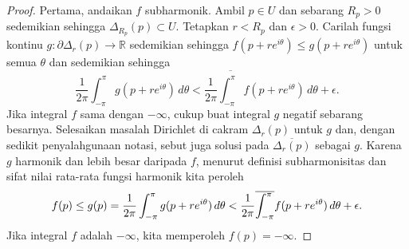 \documentclass[12pt,openany]{book}
\newcommand{\avoidbreak}{\postdisplaypenalty=100}
\newcommand{\R}{{\mathbb{R}}}
\theoremstyle{plain}
\theoremstyle{remark}
\theoremstyle{definition}
\theoremstyle{exercise}
\theoremstyle{example}
\begin{document}
\begin{proof}
Pertama, andaikan $f$ subharmonik.  Ambil $p \in U$ dan sebarang $R_p > 0$
sedemikian sehingga $\Delta_{R_p}(p) \subset U$.
Tetapkan $r < R_p$ dan $\epsilon > 0$.
Carilah fungsi kontinu $g \colon \partial \Delta_r(p) \to \R$
sedemikian sehingga $f(p+ re^{i\theta}) \leq g(p+re^{i\theta})$ untuk semua $\theta$
dan sedemikian sehingga
\begin{equation*}
\frac{1}{2\pi} \int_{-\pi}^{\pi} g(p+re^{i\theta})\, d\theta <
\frac{1}{2\pi} \overline{\int_{-\pi}^{\pi}} f(p+re^{i\theta})\, d\theta + \epsilon .
\end{equation*}
Jika integral $f$ sama dengan $-\infty$, cukup buat integral $g$
negatif sebarang besarnya.
Selesaikan masalah Dirichlet di cakram $\Delta_r(p)$ untuk $g$ dan,
dengan sedikit penyalahgunaan notasi, sebut juga solusi pada $\overline{\Delta_r(p)}$
sebagai $g$.  Karena $g$ harmonik dan lebih besar daripada $f$, menurut
definisi subharmonisitas dan sifat nilai rata-rata fungsi
harmonik kita peroleh
\begin{equation*}
f(p) \leq g(p) =
\frac{1}{2\pi} \int_{-\pi}^{\pi} g(p+re^{i\theta})\, d\theta <
\frac{1}{2\pi} \overline{\int_{-\pi}^{\pi}} f(p+re^{i\theta})\, d\theta + \epsilon .
\avoidbreak
\end{equation*}
Jika integral $f$ adalah $-\infty$, kita memperoleh $f(p) = -\infty$.


\end{proof}
\end{document}
